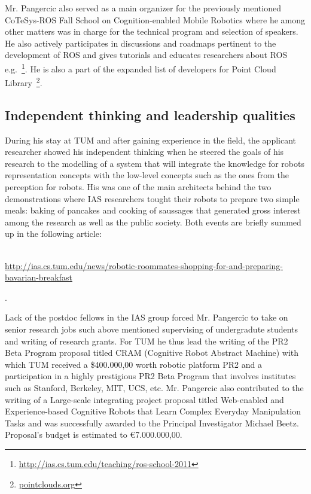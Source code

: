 Mr. Pangercic also served as a main organizer for the previously mentioned CoTeSys-ROS Fall School on 
Cognition-enabled Mobile Robotics where he among other matters was in charge for the technical
program and selection of speakers. He also actively participates in discussions and roadmaps
pertinent to the development of ROS and gives tutorials and educates researchers about
ROS e.g.~\footnote{\url{http://ias.cs.tum.edu/teaching/ros-school-2011}}. He is also a part of
the expanded list of developers for Point Cloud Library~\footnote{\url{pointclouds.org}}.
 
\subsection{Independent thinking and leadership qualities} 
During his stay at TUM and after gaining experience in the field, the applicant researcher 
showed his independent thinking when he steered the goals of his research to the
modelling of a system that will integrate the knowledge for robots representation concepts
with the low-level concepts such as the ones from the perception for robots.
His was one of the main architects behind the two demonstrations where IAS researchers
tought their robots to prepare two simple meals: baking of pancakes and cooking of 
saussages that generated gross interest among the research as well as the public
society. Both events are briefly summed up in the following 
article:\\~\begin{small}\url{http://ias.cs.tum.edu/news/robotic-roommates-shopping-for-and-preparing-bavarian-breakfast}\end{small}.

Lack of the postdoc fellows in the IAS group forced Mr. Pangercic to take on senior research
jobs such above mentioned supervising of undergradute students and writing of research grants.
For TUM he thus lead the writing of the PR2 Beta Program proposal titled CRAM (Cognitive Robot Abstract Machine)
with which TUM received a \$400.000,00 worth robotic platform PR2 and a participation in a highly 
prestigious PR2 Beta Program that involves institutes such as Stanford, Berkeley, MIT, UCS, etc.
Mr. Pangercic also contributed to the writing of a Large-scale integrating project proposal titled Web-enabled and Experience-based 
Cognitive Robots that Learn Complex Everyday Manipulation Tasks and was successfully awarded to 
the Principal Investigator Michael Beetz. Proposal's budget is estimated to \euro7.000.000,00.

